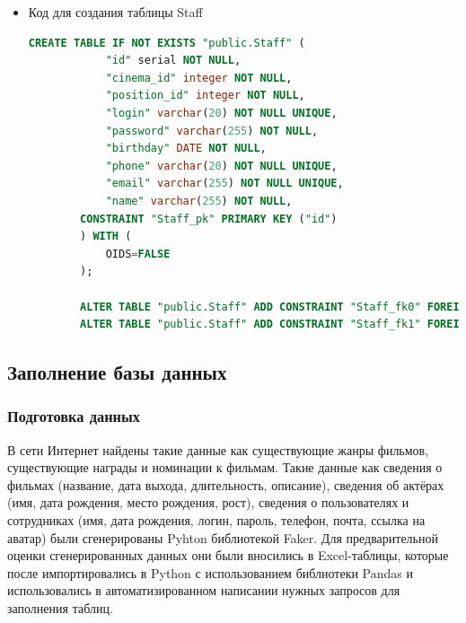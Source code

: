 \documentclass[a4paper,12pt]{article}
\renewcommand{\^}[2]{#1^{\, #2} \kern -1pt}
\newcommand{\1}{\kern 1pt}
\newcommand{\0}{\kern -1pt}
\begin{document}
\begin{itemize}
	\begin{lstlisting}[style=vscode-dark, language=SQL, label={code:sql}]
		CREATE TABLE IF NOT EXISTS "public.Cinemas_positions" (
			"id" serial NOT NULL,
			"position" varchar(255) NOT NULL UNIQUE,
			CONSTRAINT "Cinemas_positions_pk" PRIMARY KEY ("id")
		) WITH (
			OIDS=FALSE
		);
	\end{lstlisting}
	
	\item Код для создания таблицы Staff
	
	\begin{lstlisting}[style=vscode-dark, language=SQL, label={code:sql}]
		CREATE TABLE IF NOT EXISTS "public.Staff" (
			"id" serial NOT NULL,
			"cinema_id" integer NOT NULL,
			"position_id" integer NOT NULL,
			"login" varchar(20) NOT NULL UNIQUE,
			"password" varchar(255) NOT NULL,
			"birthday" DATE NOT NULL,
			"phone" varchar(20) NOT NULL UNIQUE,
			"email" varchar(255) NOT NULL UNIQUE,
			"name" varchar(255) NOT NULL,
		CONSTRAINT "Staff_pk" PRIMARY KEY ("id")
		) WITH (
			OIDS=FALSE
		);
		
		ALTER TABLE "public.Staff" ADD CONSTRAINT "Staff_fk0" FOREIGN KEY ("cinema_id") REFERENCES "public.Cinemas"("id");
		ALTER TABLE "public.Staff" ADD CONSTRAINT "Staff_fk1" FOREIGN KEY ("position_id") REFERENCES "public.Cinemas_positions"("id");
	\end{lstlisting}

	\end{itemize}
		
		
	\newpage
	
	\subsection{Заполнение базы данных}
	
	
	\subsubsection{Подготовка данных}
	
	В сети Интернет найдены такие данные как существующие жанры фильмов, существующие награды и номинации к фильмам. Такие данные как сведения о фильмах (название, дата выхода, длительность, описание), сведения об актёрах (имя, дата рождения, место рождения, рост), сведения о пользователях и сотрудниках (имя, дата рождения, логин, пароль, телефон, почта, ссылка на аватар) были сгенерированы Pyhton библиотекой Faker. Для предварительной оценки сгенерированных данных они были вносились в Excel-таблицы, которые после импортировались в Python с использованием библиотеки Pandas и использовались в автоматизированном написании нужных запросов для заполнения таблиц.
	
\end{document}
